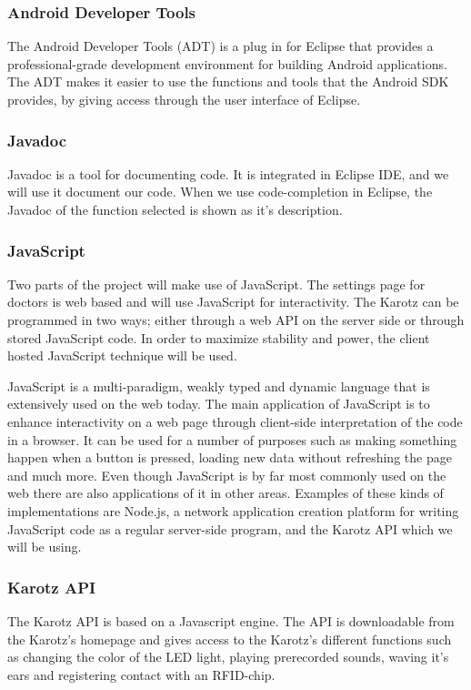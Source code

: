 \subsubsection{Android Developer Tools}
The Android Developer Tools (ADT) \cite{AndroidADT} is a plug in for Eclipse that provides a professional-grade development environment for building Android applications. The ADT makes it easier to use the functions and tools that the Android SDK provides, by giving access through the user interface of Eclipse.


\subsubsection{Javadoc}
Javadoc is a tool for documenting code. It is integrated in Eclipse IDE, and we will use it document our code. When we use code-completion in Eclipse, the Javadoc of the function selected is shown as it's description.  

\subsubsection{JavaScript}
Two parts of the project will make use of JavaScript. The settings page for doctors is web based and 
will use JavaScript for interactivity. The Karotz can be programmed in two ways; either through a web 
API on the server side or through stored JavaScript code. In order to maximize stability and power, 
the client hosted JavaScript technique will be used.

JavaScript is a multi-paradigm, weakly typed and dynamic language that is extensively used on the web 
today. The main application of JavaScript is to enhance interactivity on a web page through client-side 
interpretation of the code in a browser. It can be used for a number of purposes such as making something 
happen when a button is pressed, loading new data without refreshing the page and much more. Even 
though JavaScript is by far most commonly used on the web there are also applications of it in other 
areas. Examples of these kinds of implementations are Node.js\cite{nodejs}, a network application creation
platform for writing JavaScript code as a regular server-side program, and the Karotz API which we will be 
using.

\subsubsection{Karotz API}
The Karotz API is based on a Javascript engine. The API is downloadable from the 
Karotz's homepage and gives access to the Karotz's different functions such as changing the color 
of the LED light, playing prerecorded sounds, waving it's ears and registering contact with an RFID-chip. 

